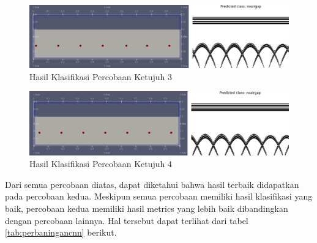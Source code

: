 \begin{figure} [H] \centering
    \includegraphics[scale=0.2]{gambar/bab4/Noarigap 19007.png}
    \caption{Hasil Klasifikasi Percobaan Ketujuh 3}
\end{figure}

\begin{figure} [H] \centering
    \includegraphics[scale=0.2]{gambar/bab4/Noairgap 20007.png}
    \caption{Hasil Klasifikasi Percobaan Ketujuh 4}
\end{figure}

Dari semua percobaan diatas, dapat diketahui bahwa hasil terbaik didapatkan pada percobaan kedua. Meskipun semua percobaan memiliki hasil klasifikasi yang baik, percobaan kedua memiliki hasil metrics yang lebih baik dibandingkan dengan percobaan lainnya. Hal tersebut dapat terlihat dari tabel \ref{tab:perbaningancnn} berikut.

